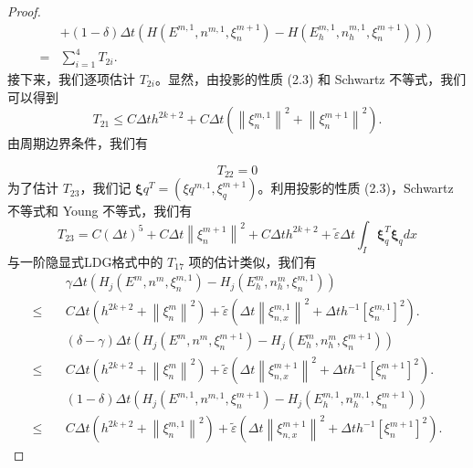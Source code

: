 \begin{proof}
\begin{align*}
          & \left.+(1-\delta) \Delta t\left(H\left(E^{m, 1}, n^{m, 1}, \xi_{n}^{m+1}\right)-H\left(E_{h}^{m, 1}, n_{h}^{m, 1}, \xi_{n}^{m+1}\right)\right)\right)                                                                                     \\
        = & \sum_{i=1}^{4} T_{2 i} .
    \end{align*}
    接下来，我们逐项估计 $T_{2 i}$。显然，由投影的性质 (2.3) 和 Schwartz 不等式，我们可以得到
    \begin{equation}
        T_{21} \leq C \Delta t h^{2 k+2}+C \Delta t\left(\left\|\xi_{n}^{m, 1}\right\|^{2}+\left\|\xi_{n}^{m+1}\right\|^{2}\right) .
    \end{equation}
    由周期边界条件，我们有

    \begin{equation}
        T_{22}=0
    \end{equation}
    为了估计 $T_{23}$，我们记 $\boldsymbol{\xi}{q}^{T}=\left(\xi{q}^{m, 1}, \xi_{q}^{m+1}\right)$。利用投影的性质 (2.3)，Schwartz 不等式和 Young 不等式，我们有
    \begin{equation}
        T_{23}=C(\Delta t)^{5}+C \Delta t\left\|\xi_{n}^{m+1}\right\|^{2}+C \Delta t h^{2 k+2}+\tilde{\varepsilon} \Delta t \int_{I} \boldsymbol{\xi}_{q}^{T} \boldsymbol{\xi}_{q} d x
    \end{equation}
    与一阶隐显式LDG格式中的 $T_{17}$ 项的估计类似，我们有
    \begin{align*}
                   & \gamma \Delta t\left(H_{j}\left(E^{m}, n^{m}, \xi_{n}^{m, 1}\right)-H_{j}\left(E_{h}^{m}, n_{h}^{m}, \xi_{n}^{m, 1}\right)\right)                                                              \\
        \leq       & C \Delta t\left(h^{2 k+2}+\left\|\xi_{n}^{m}\right\|^{2}\right)+\tilde{\varepsilon}\left(\Delta t\left\|\xi_{n, x}^{m, 1}\right\|^{2}+\Delta t h^{-1}\left[\xi_{n}^{m, 1}\right]^{2}\right) .  \\
                   & (\delta-\gamma) \Delta t\left(H_{j}\left(E^{m}, n^{m}, \xi_{n}^{m+1}\right)-H_{j}\left(E_{h}^{m}, n_{h}^{m}, \xi_{n}^{m+1}\right)\right)                                                       \\
        \leq \quad & C \Delta t\left(h^{2 k+2}+\left\|\xi_{n}^{m}\right\|^{2}\right)+\tilde{\varepsilon}\left(\Delta t\left\|\xi_{n, x}^{m+1}\right\|^{2}+\Delta t h^{-1}\left[\xi_{n}^{m+1}\right]^{2}\right) .    \\
                   & (1-\delta) \Delta t\left(H_{j}\left(E^{m, 1}, n^{m, 1}, \xi_{n}^{m+1}\right)-H_{j}\left(E_{h}^{m, 1}, n_{h}^{m, 1}, \xi_{n}^{m+1}\right)\right)                                                \\
        \leq       & C \Delta t\left(h^{2 k+2}+\left\|\xi_{n}^{m, 1}\right\|^{2}\right)+\tilde{\varepsilon}\left(\Delta t\left\|\xi_{n, x}^{m+1}\right\|^{2}+\Delta t h^{-1}\left[\xi_{n}^{m+1}\right]^{2}\right) .
    \end{align*}


\end{proof}

